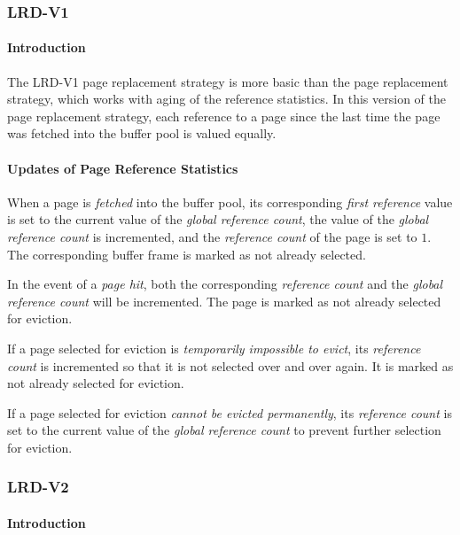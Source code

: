 \subsubsection{LRD-V1} \label{subsubsec:lrd-v1}

\paragraph{Introduction}

    The LRD-V1 page replacement strategy is more basic than the  page replacement strategy, which works with aging of the reference statistics. In this version of the  page replacement strategy, each reference to a page since the last time the page was fetched into the buffer pool is valued equally.

\paragraph{Updates of Page Reference Statistics}

    When a page is \emph{fetched} into the buffer pool, its corresponding \textit{first reference} value is set to the current value of the \textit{global reference count}, the value of the \textit{global reference count} is incremented, and the \textit{reference count} of the page is set to $1$. The corresponding buffer frame is marked as not already selected.

    In the event of a \emph{page hit}, both the corresponding \textit{reference count} and the \textit{global reference count} will be incremented. The page is marked as not already selected for eviction.

    If a page selected for eviction is \emph{temporarily impossible to evict}, its \textit{reference count} is incremented so that it is not selected over and over again. It is marked as not already selected for eviction.

    If a page selected for eviction \emph{cannot be evicted permanently}, its \textit{reference count} is set to the current value of the \textit{global reference count} to prevent further selection for eviction.

\subsubsection{LRD-V2} \label{subsubsec:lrd-v2}

\paragraph{Introduction}

